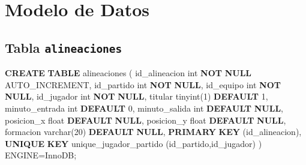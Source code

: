 \documentclass[
  spanish,
  11pt,
  letterpaper,
]{book}
\newenvironment{Shaded}{\begin{snugshade}}{\end{snugshade}}
\newcommand{\DataTypeTok}[1]{\textcolor[rgb]{0.68,0.00,0.00}{#1}}
\newcommand{\DecValTok}[1]{\textcolor[rgb]{0.68,0.00,0.00}{#1}}
\newcommand{\KeywordTok}[1]{\textcolor[rgb]{0.00,0.23,0.31}{\textbf{#1}}}
\newcommand{\NormalTok}[1]{\textcolor[rgb]{0.00,0.23,0.31}{#1}}
\newcommand{\OperatorTok}[1]{\textcolor[rgb]{0.37,0.37,0.37}{#1}}
\newcommand{\StringTok}[1]{\textcolor[rgb]{0.13,0.47,0.30}{#1}}
\begin{document}
\section{Modelo de Datos}\label{modelo-de-datos}

\subsection{\texorpdfstring{Tabla
\texttt{alineaciones}}{Tabla alineaciones}}\label{tabla-alineaciones}

\begin{Shaded}
\begin{Highlighting}[]
\KeywordTok{CREATE} \KeywordTok{TABLE}\NormalTok{ \textasciigrave{}alineaciones\textasciigrave{} (}
\NormalTok{  \textasciigrave{}id\_alineacion\textasciigrave{} }\DataTypeTok{int} \KeywordTok{NOT} \KeywordTok{NULL}\NormalTok{ AUTO\_INCREMENT,}
\NormalTok{  \textasciigrave{}id\_partido\textasciigrave{} }\DataTypeTok{int} \KeywordTok{NOT} \KeywordTok{NULL}\NormalTok{,}
\NormalTok{  \textasciigrave{}id\_equipo\textasciigrave{} }\DataTypeTok{int} \KeywordTok{NOT} \KeywordTok{NULL}\NormalTok{,}
\NormalTok{  \textasciigrave{}id\_jugador\textasciigrave{} }\DataTypeTok{int} \KeywordTok{NOT} \KeywordTok{NULL}\NormalTok{,}
\NormalTok{  \textasciigrave{}titular\textasciigrave{} tinyint(}\DecValTok{1}\NormalTok{) }\KeywordTok{DEFAULT} \StringTok{\textquotesingle{}1\textquotesingle{}}\NormalTok{,}
\NormalTok{  \textasciigrave{}minuto\_entrada\textasciigrave{} }\DataTypeTok{int} \KeywordTok{DEFAULT} \StringTok{\textquotesingle{}0\textquotesingle{}}\NormalTok{,}
\NormalTok{  \textasciigrave{}minuto\_salida\textasciigrave{} }\DataTypeTok{int} \KeywordTok{DEFAULT} \KeywordTok{NULL}\NormalTok{,}
\NormalTok{  \textasciigrave{}posicion\_x\textasciigrave{} }\DataTypeTok{float} \KeywordTok{DEFAULT} \KeywordTok{NULL}\NormalTok{,}
\NormalTok{  \textasciigrave{}posicion\_y\textasciigrave{} }\DataTypeTok{float} \KeywordTok{DEFAULT} \KeywordTok{NULL}\NormalTok{,}
\NormalTok{  \textasciigrave{}formacion\textasciigrave{} }\DataTypeTok{varchar}\NormalTok{(}\DecValTok{20}\NormalTok{) }\KeywordTok{DEFAULT} \KeywordTok{NULL}\NormalTok{,}
  \KeywordTok{PRIMARY} \KeywordTok{KEY}\NormalTok{ (\textasciigrave{}id\_alineacion\textasciigrave{}),}
  \KeywordTok{UNIQUE} \KeywordTok{KEY}\NormalTok{ \textasciigrave{}unique\_jugador\_partido\textasciigrave{} (\textasciigrave{}id\_partido\textasciigrave{},\textasciigrave{}id\_jugador\textasciigrave{})}
\NormalTok{) ENGINE}\OperatorTok{=}\NormalTok{InnoDB;}
\end{Highlighting}
\end{Shaded}
\end{document}
